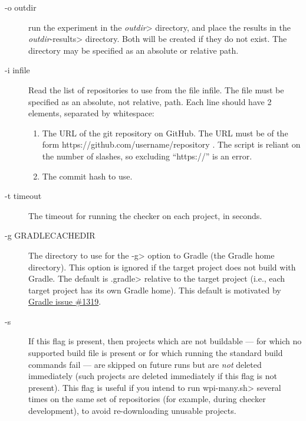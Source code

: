 \begin{description}
\item[-o outdir]
  run the experiment in the \<\emph{outdir}> directory, and place the results in
  the \<\emph{outdir}-results> directory. Both will be created if they do not
  exist.  The directory may be specified as an absolute or relative path.

\item[-i infile]
  Read the list of repositories to use from the file infile.
  The file must be specified as an absolute, not relative, path.
  Each line
  should have 2 elements, separated by whitespace:
  \begin{enumerate}
  \item
    The URL of the git repository on GitHub. The URL must be of the form
    https://github.com/username/repository .  The script is reliant on the
    number of slashes, so excluding ``https://'' is an error.
  \item The commit hash to use.
  \end{enumerate}

\item[-t timeout]
  The timeout for running the checker on each project, in seconds.

\item[-g GRADLECACHEDIR]
  The directory to use for the \<-g> option to Gradle (the Gradle home
  directory). This option is ignored if the target project does not
  build with Gradle. The default is \<.gradle> relative to the target
  project (i.e., each target project has its own Gradle home). This default
  is motivated by
  \href{https://github.com/gradle/gradle/issues/1319}{Gradle issue \#1319}.

\item[-s]
  If this flag is present, then projects which are not buildable --- for which
  no supported build file is present or for which running the standard build
  commands fail --- are skipped on future runs but are \emph{not} deleted immediately
  (such projects are deleted immediately if this flag is not present). This flag is useful
  if you intend to run \<wpi-many.sh> several times on the same set of repositories
  (for example, during checker development), to avoid re-downloading unusable projects.

\end{description}



